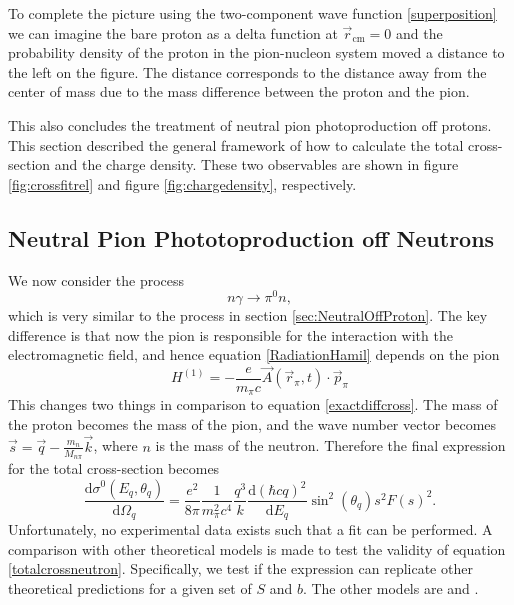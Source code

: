 To complete the picture using the two-component wave function \eqref{superposition} we can imagine the bare proton as a delta function at $\vec{r}_\text{cm}=0$ and the probability density of the proton in the pion-nucleon system moved a distance to the left on the figure. The distance corresponds to the distance away from the center of mass due to the mass difference between the proton and the pion. 

This also concludes the treatment of neutral pion photoproduction off protons. This section described the general framework of how to calculate the total cross-section and the charge density. These two observables are shown in figure \ref{fig:crossfitrel} and figure \ref{fig:chargedensity}, respectively.


\subsection{Neutral Pion Phototoproduction off Neutrons}
We now consider the process 
\begin{equation} \label{process2}
	n\gamma \rightarrow \pi^0 n,
\end{equation}
which is very similar to the process in section \ref{sec:NeutralOffProton}. The key difference is that now the pion is responsible for the interaction with the electromagnetic field, and hence equation \eqref{RadiationHamil} depends on the pion 
\begin{equation} \label{RadiNeutron}
	H^{(1)} = -\frac{e}{m_\pi c}\vec{A}(\vec{r}_\pi,t)\cdot\vec{p}_\pi	
\end{equation}
This changes two things in comparison to equation \eqref{exactdiffcross}. The mass of the proton becomes the mass of the pion, and the wave number vector becomes $\vec{s}=\vec{q}-\frac{m_n}{M_{n\pi}}\vec{k}$, where $n$ is the mass of the neutron. Therefore the final expression for the total cross-section becomes 
\begin{equation} \label{totalcrossneutron}
	\frac{\text{d}\sigma^0(E_q,\theta_q)}{\text{d}\Omega_q} = \frac{e^2}{8\pi}\frac{1}{m_\pi^2c^4}\frac{q^3}{k}\frac{\text{d}(\hbar c q)^2}{\text{d}E_q}\sin^2(\theta_q) s^2 F(s)^2.
\end{equation}
Unfortunately, no experimental data exists such that a fit can be performed. A comparison with other theoretical models is made to test the validity of equation \eqref{totalcrossneutron}. Specifically, we test if the expression can replicate other theoretical predictions for a given set of $S$ and $b$. The other models are \cite{MAINZA2} and \cite{MAID2017}.
